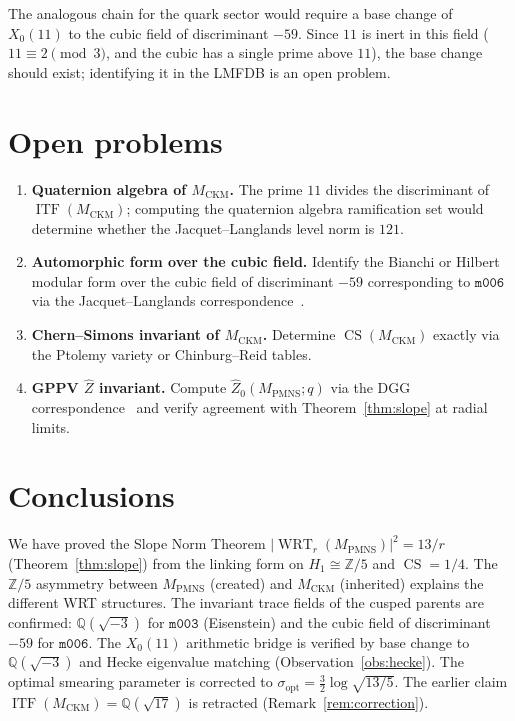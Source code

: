 \documentclass[11pt,a4paper]{article}
\theoremstyle{definition}
\newcommand{\Z}{\mathbb{Z}}
\newcommand{\Q}{\mathbb{Q}}
\newcommand{\mfld}[1]{\texttt{#1}}
\newcommand{\WRT}{\operatorname{WRT}}
\newcommand{\CS}{\operatorname{CS}}
\newcommand{\ITF}{\operatorname{ITF}}
\begin{document}
The analogous chain for the quark sector would require a base change of
$X_0(11)$ to the cubic field of discriminant $-59$. Since $11$ is inert
in this field ($11\equiv2\pmod3$, and the cubic has a single prime above
$11$), the base change should exist; identifying it in the LMFDB is an
open problem.

\section{Open problems}
\label{sec:open}

\begin{enumerate}
\item \textbf{Quaternion algebra of $M_{\mathrm{CKM}}$.}
  The prime $11$ divides the discriminant of $\ITF(M_{\mathrm{CKM}})$;
  computing the quaternion algebra ramification set would determine
  whether the Jacquet--Langlands level norm is $121$.
\item \textbf{Automorphic form over the cubic field.}
  Identify the Bianchi or Hilbert modular form over the cubic field
  of discriminant $-59$ corresponding to $\mfld{m006}$ via the
  Jacquet--Langlands correspondence~\cite{JL}.
\item \textbf{Chern--Simons invariant of $M_{\mathrm{CKM}}$.}
  Determine $\CS(M_{\mathrm{CKM}})$ exactly via the Ptolemy variety
  or Chinburg--Reid tables.
\item \textbf{GPPV $\hat{Z}$ invariant.}
  Compute $\hat{Z}_0(M_{\mathrm{PMNS}};q)$ via the DGG
  correspondence~\cite{DGG} and verify agreement with
  Theorem~\ref{thm:slope} at radial limits.
\end{enumerate}

\section{Conclusions}

We have proved the Slope Norm Theorem
$|\WRT_r(M_{\mathrm{PMNS}})|^2=13/r$ (Theorem~\ref{thm:slope})
from the linking form on $H_1\cong\Z/5$ and $\CS=1/4$.
The $\Z/5$ asymmetry between $M_{\mathrm{PMNS}}$ (created) and
$M_{\mathrm{CKM}}$ (inherited) explains the different WRT structures.
The invariant trace fields of the cusped parents are confirmed:
$\Q(\sqrt{-3})$ for $\mfld{m003}$ (Eisenstein) and the cubic field
of discriminant $-59$ for $\mfld{m006}$.
The $X_0(11)$ arithmetic bridge is verified by base change to
$\Q(\sqrt{-3})$ and Hecke eigenvalue matching (Observation~\ref{obs:hecke}).
The optimal smearing parameter is corrected to
$\sigma_{\mathrm{opt}}=\tfrac32\log\sqrt{13/5}$.
The earlier claim $\ITF(M_{\mathrm{CKM}})=\Q(\sqrt{17})$
is retracted (Remark~\ref{rem:correction}).
\end{document}
